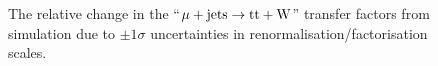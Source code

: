 \begin{figure}[!h]
{  } \\
   ~
  \caption{\label{fig:tfSyst_scale_muToTtw} The relative change in the
    ``$\mu + \textrm{jets} \rightarrow \mathrm{tt+W}$'' transfer factors from
    simulation due to $\pm1\sigma$ uncertainties in
    renormalisation/factorisation scales.  }
\end{figure}

